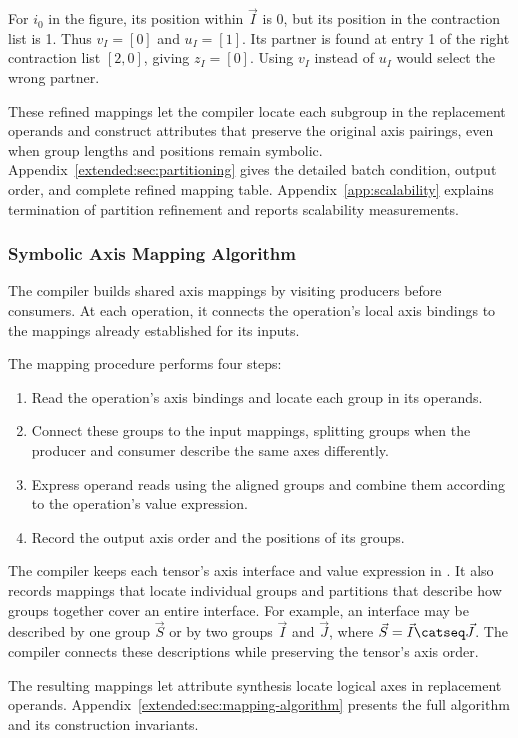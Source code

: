 For $i_0$ in the figure, its position within $\vec I$ is 0, but its position
in the contraction list is 1. Thus $v_I=[0]$ and $u_I=[1]$.
Its partner is found at entry 1 of the right contraction list $[2,0]$,
giving $z_I=[0]$. Using $v_I$ instead of $u_I$ would select the wrong partner.

These refined mappings let the compiler locate each subgroup in the
replacement operands and construct attributes that preserve the original
axis pairings, even when group lengths and positions remain symbolic.
Appendix~\ref{extended:sec:partitioning} gives the detailed batch condition,
output order, and complete refined mapping table.
Appendix~\ref{app:scalability} explains termination of partition refinement
and reports scalability measurements.

\subsubsection{Symbolic Axis Mapping Algorithm}
\label{sec:mapping-algorithm}
The compiler builds shared axis mappings by visiting producers before
consumers. At each operation, it connects the operation's local axis
bindings to the mappings already established for its inputs.

The mapping procedure performs four steps:
\begin{enumerate}
\item Read the operation's axis bindings and locate each group in its operands.
\item Connect these groups to the input mappings, splitting groups when
      the producer and consumer describe the same axes differently.
\item Express operand reads using the aligned groups and combine them
      according to the operation's value expression.
\item Record the output axis order and the positions of its groups.
\end{enumerate}

The compiler keeps each tensor's axis interface and value expression in
. It also records mappings that locate individual groups and
partitions that describe how groups together cover an entire interface.
For example, an interface may be described by one group $\vec S$ or by two
groups $\vec I$ and $\vec J$, where $\vec S=\vec I\catseq\vec J$. The compiler connects these
descriptions while preserving the tensor's axis order.

The resulting mappings let attribute synthesis locate logical axes in
replacement operands. Appendix~\ref{extended:sec:mapping-algorithm}
presents the full algorithm and its construction invariants.
